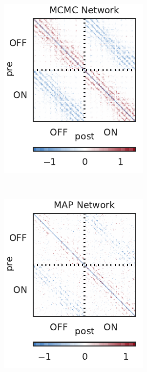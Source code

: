 \begin{figure}[t!]
\begin{subfigure}[b]{1.8in}
    \includegraphics[width=\textwidth]{figures/ch3/synth_rgc_mcmc_conn.pdf}
    \label{fig:synth_rgc_mcmc_conn}
  \end{subfigure}
  ~
  \begin{subfigure}[b]{1.8in}
    \centering
    \caption{}
    \vspace{-.25in}
    \includegraphics[width=\textwidth]{figures/ch3/synth_rgc_bfgs_conn.pdf}

\end{subfigure}
\end{figure}
